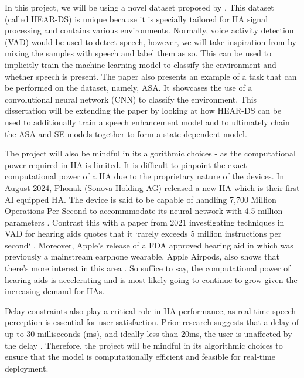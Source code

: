 \documentclass[logo,bsc,singlespacing,parskip,online]{infthesis}
\begin{document}
In this project, we will be using a novel dataset proposed by \citet{Huwel2020HearDS}.
This dataset (called HEAR-DS) is unique because it is specially tailored for HA signal processing and contains
various environments. Normally, voice activity detection (VAD) would be 
used to detect speech, however, we will take inspiration from \citet{Huwel2020HearDS}
by mixing the samples with speech and label them as so. 
This can be used to implicitly train the machine learning model to classify the environment 
and whether speech is present.
The paper also presents an example of a task that can be performed on the dataset, 
namely, ASA. It showcases the use of a convolutional neural network (CNN) to classify the environment.
This dissertation will be extending the paper by looking at how HEAR-DS can be used 
to additionally train a speech enhancement model 
and to ultimately chain the ASA and SE models together to form a state-dependent model.

The project will also be mindful in its algorithmic choices - as the computational
power required in HA is limited. It is difficult to pinpoint the exact computational power of a HA
due to the proprietary nature of the devices. In August 2024,
Phonak (Sonova Holding AG) released a new HA which is their first AI 
equipped HA. The device is said to be capable of handling 7,700 Million 
Operations Per Second to accommmodate its neural network with 4.5 million parameters \citep{Hasemann2024PhonakSphere}.  Contrast this with a paper 
from 2021 investigating techniques in VAD for hearing aids 
quotes that it `rarely exceeds 5 million instructions per second` \citep{Gomez2021MIPS}.
Moreover, Apple's release of a FDA approved hearing aid in which was previously a mainstream earphone wearable,
Apple Airpods, also shows that there's more interest in this area \citep{Apple2025Airpods}.
So suffice to say, the computational power of hearing aids is accelerating 
and is most likely going to continue to grow given the increasing demand 
for HAs.

Delay constraints also play a critical role in HA performance, as real-time speech perception is essential for user satisfaction.
Prior research suggests that a delay of up to 30 milliseconds (ms), and ideally less than 20ms, the user
is unaffected by the delay \citep{Stone2002Delays}. Therefore, the project will be mindful in its algorithmic choices to ensure that the model
is computationally efficient and feasible for real-time deployment.
\end{document}
